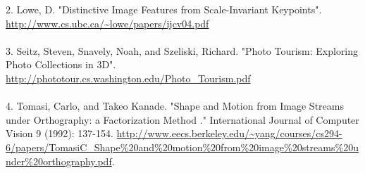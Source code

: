 \documentclass[12pt]{article}
\begin{document}
\begin{multicols}{2}
2. Lowe, D. "Distinctive Image Features from Scale-Invariant Keypoints". \url{http://www.cs.ubc.ca/~lowe/papers/ijcv04.pdf} \\\\
3. Seitz, Steven, Snavely, Noah, and Szeliski, Richard. "Photo Tourism: Exploring Photo Collections in 3D". \url{http://phototour.cs.washington.edu/Photo_Tourism.pdf} \\\\
4. Tomasi, Carlo, and Takeo Kanade. "Shape and Motion from Image Streams under Orthography: a Factorization Method ." International Journal of Computer Vision 9 (1992): 137-154. \url{http://www.eecs.berkeley.edu/~yang/courses/cs294-6/papers/TomasiC_Shape\%20and\%20motion\%20from\%20image\%20streams\%20under\%20orthography.pdf}. \\

\end{multicols}
\end{document}
